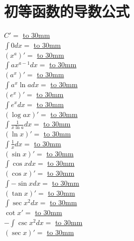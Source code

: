 \documentclass[a4paper]{ctexart}
\begin{document}
\section{初等函数的导数公式}

\begin{multicols}{2}
    $C'=$                           
        \underline{\hbox to 30mm{}} \\
    $\int{0dx}=$                    
        \underline{\hbox to 30mm{}} \\
    $(x^a)'=$                       
    \underline{\hbox to 30mm{}} \\
    $\int{ ax^{a-1} dx}=$           
    \underline{\hbox to 30mm{}} \\
    $(a^x)'=$                        
    \underline{\hbox to 30mm{}} \\
    $\int{ a^x\ln{a}dx}=$            
    \underline{\hbox to 30mm{}} \\
    $(e^x)'=$                       
    \underline{\hbox to 30mm{}} \\
    $\int{e^x dx}=$                 
    \underline{\hbox to 30mm{}} \\
    $(\log{a}{x})'=$                
    \underline{\hbox to 30mm{}} \\
    $\int{\frac{1}{x\ln{a}}dx}=$    
    \underline{\hbox to 30mm{}} \\
    $(\ln{x})'=$                    
    \underline{\hbox to 30mm{}} \\
    $\int{\frac{1}{x}dx}=$          
    \underline{\hbox to 30mm{}} \\
    $(\sin{x})'=$                   
    \underline{\hbox to 30mm{}} \\
    $\int{\cos{x}dx}=$              
    \underline{\hbox to 30mm{}} \\
    $(\cos{x})'=$                   
    \underline{\hbox to 30mm{}} \\
    $\int{-\sin{x}dx}=$             
    \underline{\hbox to 30mm{}} \\
    $(\tan{x})'=$                   
    \underline{\hbox to 30mm{}} \\
    $\int{\sec{x}^2dx} = $          
    \underline{\hbox to 30mm{}} \\
    ${\cot{x}}'=$                   
    \underline{\hbox to 30mm{}} \\
    $-\int{\csc{x}^2dx}=$           
    \underline{\hbox to 30mm{}} \\
    $(\sec{x})'=$                   
    \underline{\hbox to 30mm{}} \\

\end{multicols}
\end{document}
